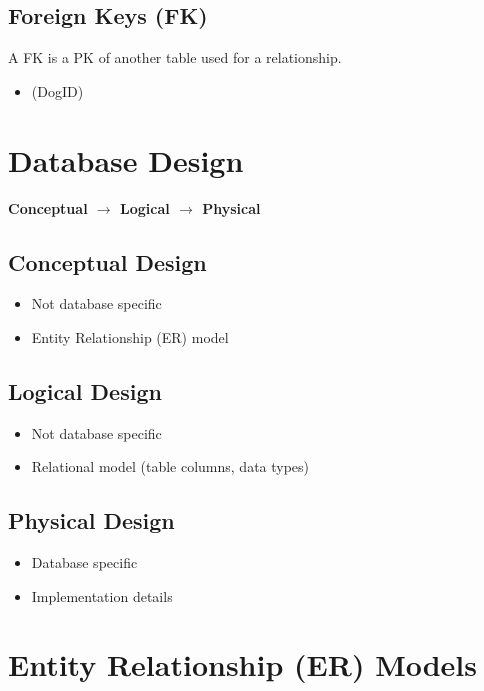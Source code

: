 \documentclass[12pt, a4paper]{article}
\begin{document}
    \subsection{Foreign Keys (FK)}
    A FK is a PK of another table used for a relationship. 
    \begin{itemize}
        \item (DogID)
    \end{itemize}
    


    \section{Database Design}
    \textbf{Conceptual $\rightarrow$ Logical $\rightarrow$ Physical} 

    \subsection{Conceptual Design}
    \begin{itemize}
        \item Not database specific 
        \item Entity Relationship (ER) model 
    \end{itemize}

    \subsection{Logical Design}
    \begin{itemize}
        \item Not database specific 
        \item Relational model (table columns, data types) 
    \end{itemize}

    \subsection{Physical Design}
    \begin{itemize}
        \item Database specific 
        \item Implementation details 
    \end{itemize}



    \section{Entity Relationship (ER) Models}
\end{document}
